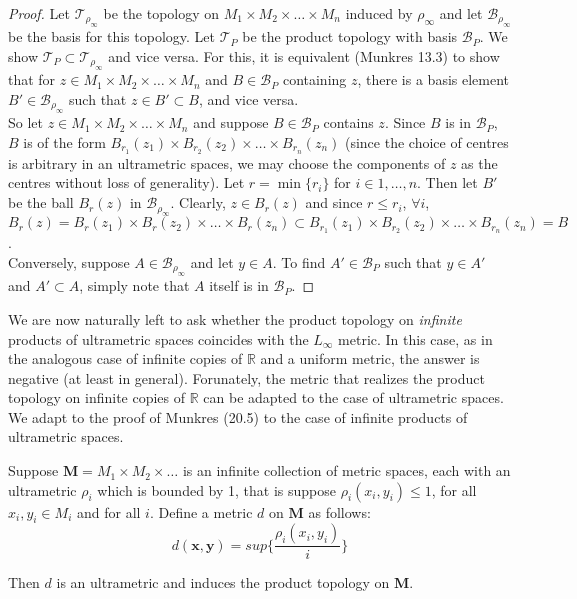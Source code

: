 \begin{proof}
Let $\mathcal{T}_{\rho_\infty}$ be the topology on $M_{1} \times M_{2} \times \ldots \times M_{n}$ induced by $\rho_\infty$ and let $\mathcal{B}_{\rho_\infty}$ be the basis for this topology. Let $\mathcal{T}_{P}$ be the product topology with basis $\mathcal{B}_P$. We show $\mathcal{T}_{P} \subset \mathcal{T}_{\rho_\infty}$ and vice versa. For this, it is equivalent (Munkres 13.3) to show that for $z \in  M_{1} \times M_{2} \times \ldots \times M_{n}$ and $B \in \mathcal{B}_{P}$ containing $z$, there is a basis element $B' \in \mathcal{B}_{\rho_\infty}$ such that $z \in B' \subset B$, and vice versa.\\

So let  $z \in M_{1} \times M_{2} \times \ldots \times M_{n}$ and suppose $B \in \mathcal{B}_{P}$ contains $z$. Since $B$ is in $\mathcal{B}_{P}$, $B$ is of the form $B_{r_1}(z_1) \times B_{r_2}(z_2) \times \ldots \times B_{r_n}(z_n)$ (since the choice of centres is arbitrary in an ultrametric spaces, we may choose the components of $z$ as the centres without loss of generality). Let $r=\min \{r_i\}$ for $i \in 1,\ldots, n$. Then let $B'$ be the ball $B_r(z)$ in $ \mathcal{B}_{\rho_\infty}$. Clearly, $z \in B_r(z)$ and since $r \leq r_i$, $\forall i$, $B_r(z) = B_r(z_1) \times B_r(z_2) \times \ldots \times B_r(z_n) \subset  B_{r_1}(z_1) \times B_{r_2}(z_2) \times \ldots \times B_{r_n}(z_n) =B$.\\

Conversely, suppose $A \in \mathcal{B}_{\rho_\infty}$ and let $y \in A$. To find $A' \in \mathcal{B}_{P}$ such that $y \in A'$ and $A' \subset A$, simply note that $A$ itself is in $\mathcal{B}_{P}$.

\end{proof}

We are now naturally left to ask whether the product topology on \textit{infinite} products of ultrametric spaces coincides with the $L_\infty$ metric. In this case, as in the analogous case of infinite copies of $\mathbb{R}$ and a uniform metric, the answer is negative (at least in general). Forunately, the metric that realizes the product topology on infinite copies of $\mathbb{R}$ can be adapted to the case of ultrametric spaces. We adapt to the proof of Munkres (20.5) to the case of infinite products of ultrametric spaces.

\begin{proposition}
Suppose $\textbf{M} = M_{1} \times M_{2} \times \ldots$ is an infinite collection of metric spaces, each with an ultrametric $\rho_i$ which is bounded by 1, that is suppose $\rho_i(x_i,y_i) \leq 1$, for all $x_i, y_i \in M_i$ and for all $i$. Define a metric $d$ on $\textbf{M}$ as follows: \[d(\textbf{x},\textbf{y}) = sup\{\frac{\rho_i(x_i,y_i)}{i}\}\]

Then $d$ is an ultrametric and induces the product topology on $\textbf{M}$.
\end{proposition}

